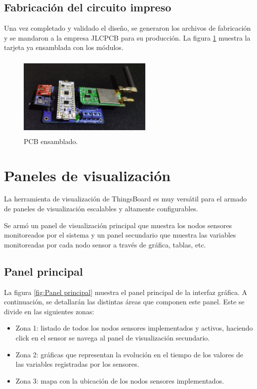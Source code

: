\subsection{Fabricación del circuito impreso} 
Una vez completado y validado el diseño, se generaron los archivos de fabricación y se mandaron a la empresa JLCPCB para su producción. La figura \ref{fig:PCB ensamblado} muestra la tarjeta ya ensamblada con los módulos. 
\begin{figure}[h!]
  \centering
	\includegraphics[width=6.5cm, height=4cm]{./Figures/hardware_vistalateral.png}
  \caption{PCB ensamblado.}
	\label{fig:PCB ensamblado}
\end{figure}

\section{Paneles de visualización}
La herramienta de visualización de ThingsBoard es muy versátil para el armado de paneles de visualización escalables y altamente configurables.

Se armó un panel de visualización principal que muestra los nodos sensores monitoreados por el sistema y un panel secundario que muestra las variables monitoreadas por cada nodo sensor a través de gráfica, tablas, etc.

\subsection{Panel principal} 
La figura \ref{fig:Panel principal} muestra el panel principal de la interfaz gráfica. A continuación, se detallarán las distintas áreas que componen este panel. Este se divide en las siguientes zonas:

\begin{itemize}
  \item Zona 1: listado de todos los nodos sensores implementados y activos, haciendo click en el sensor se navega al panel de visualización secundario.
  \item Zona 2: gráficas que representan la evolución en el tiempo de los valores de las variables registradas por los sensores.
  \item Zona 3: mapa con la ubicación de los nodos sensores implementados.
\end{itemize}

